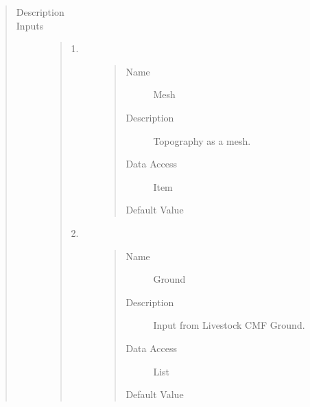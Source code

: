 \documentclass[letterpaper,10pt,english]{sphinxmanual}
\begin{document}
\begin{quote}\begin{description}
\item[{Description}] \leavevmode
{}

\item[{Inputs}] \leavevmode\begin{quote}\begin{description}
\item[{1.}] \leavevmode\begin{quote}\begin{description}
\item[{Name}] \leavevmode
Mesh

\item[{Description}] \leavevmode
Topography as a mesh.

\item[{Data Access}] \leavevmode
Item

\item[{Default Value}] \leavevmode
{}

\end{description}\end{quote}

\item[{2.}] \leavevmode\begin{quote}\begin{description}
\item[{Name}] \leavevmode
Ground

\item[{Description}] \leavevmode
Input from Livestock CMF Ground.

\item[{Data Access}] \leavevmode
List

\item[{Default Value}] \leavevmode
{}

\end{description}\end{quote}


\end{description}
\end{quote}
\end{description}
\end{quote}
\end{document}
